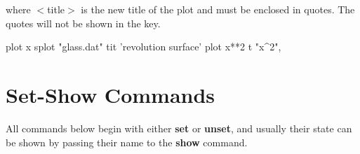 where $<$title$>$ is the new title of the plot and must be enclosed in
quotes. The quotes will not be shown in the key.

 {plot x}
{splot "glass.dat" tit 'revolution surface'}
    {plot x**2 t "x^2", \\}

\section{Set-Show Commands}

All commands below begin with either {\bf set} or {\bf unset}, and
usually their state can be shown by passing their name to the {\bf
  show} command.


